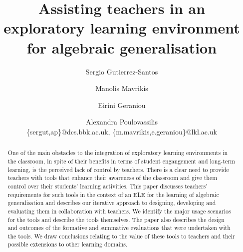 \documentclass[authoryear,preprint,12pt]{elsarticle}
\begin{document}
\begin{frontmatter}



\title{Assisting teachers in an exploratory learning environment
  for algebraic generalisation} 



\author{Sergio Gutierrez-Santos \and Manolis Mavrikis \and Eirini
  Geraniou \and Alexandra Poulovassilis \\ 
  \{sergut,ap\}@dcs.bbk.ac.uk, \{m.mavrikis,e.geraniou\}@lkl.ac.uk}

\address{London Knowledge Lab} 

\begin{abstract}
One of the main obstacles to the integration of exploratory learning
environments in the classroom, in spite of their benefits in terms of
student engangement and long-term learning, is the perceived lack of
control by teachers. There is a clear need to provide teachers with
tools that enhance their awareness of the classroom and give them
control over their students' learning activities. 
%
This paper discusses
teachers’ requirements for such tools in the context of an ELE for the
learning of algebraic generalisation and describes our iterative
approach to designing, developing and evaluating them in collaboration
with teachers. We identify the major usage scenarios for the tools and
describe the tools themselves. 
%
The paper also describes the design and outcomes of the formative and
summative evaluations that were undertaken with the tools. We draw
conclusions relating to the value of these tools to teachers and their
possible extensions to other learning domains.
\end{abstract}


\end{frontmatter}
\end{document}
